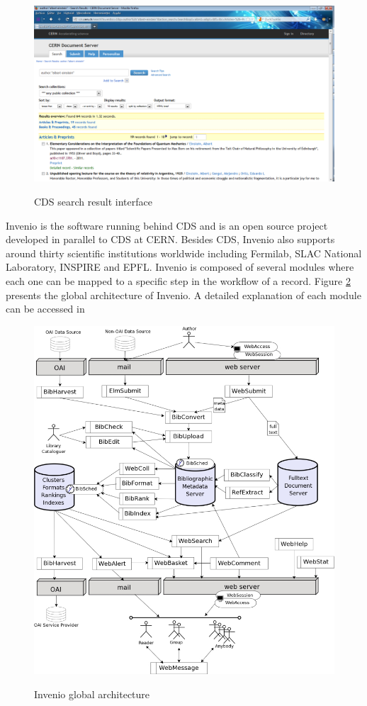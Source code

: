 \begin{figure}
\centering
\includegraphics[height=7 cm]{figures/cds_screenshot.png}
\label{cds_screenshot}
\caption{CDS search result interface}
\end{figure}
 


Invenio\cite{invenio} is the software running behind CDS and is an open source project developed in parallel to CDS at CERN. Besides CDS, Invenio also supports around thirty scientific institutions worldwide including Fermilab, SLAC National Laboratory, INSPIRE and EPFL. 
Invenio is composed of several modules where each one can be mapped to a specific step in the workflow of a record. Figure \ref{invenio_architecture} presents the global architecture of Invenio. A detailed explanation of each module can be accessed in\cite{invenio_modules} 

\begin{figure}
\centering
\includegraphics[height=10 cm]{figures/invenio.jpeg}
\label{invenio_architecture}
\caption{Invenio global architecture}
\end{figure}


